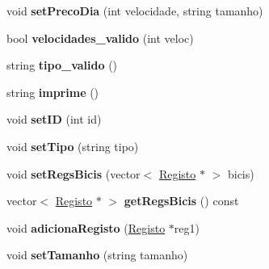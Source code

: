 \begin{DoxyCompactItemize}
\item 
\hypertarget{class_bicicleta_a830e5be0d74c904f9e1b4d0e46fcfbf6}{void {\bfseries set\+Preco\+Dia} (int velocidade, string tamanho)}\label{class_bicicleta_a830e5be0d74c904f9e1b4d0e46fcfbf6}

\item 
\hypertarget{class_bicicleta_a540f165785ed17b710a67c2a59991a48}{bool {\bfseries velocidades\+\_\+valido} (int veloc)}\label{class_bicicleta_a540f165785ed17b710a67c2a59991a48}

\item 
\hypertarget{class_bicicleta_a34990240a07a851793053ca4063a7b8e}{string {\bfseries tipo\+\_\+valido} ()}\label{class_bicicleta_a34990240a07a851793053ca4063a7b8e}

\item 
\hypertarget{class_bicicleta_a900359b6b195db211f479fe5929f8d81}{string {\bfseries imprime} ()}\label{class_bicicleta_a900359b6b195db211f479fe5929f8d81}

\item 
\hypertarget{class_bicicleta_a6e71bf61a37f13c3da8e620760f8f4b9}{void {\bfseries set\+I\+D} (int id)}\label{class_bicicleta_a6e71bf61a37f13c3da8e620760f8f4b9}

\item 
\hypertarget{class_bicicleta_a2318e7e7a22c44283e143f3c2942d721}{void {\bfseries set\+Tipo} (string tipo)}\label{class_bicicleta_a2318e7e7a22c44283e143f3c2942d721}

\item 
\hypertarget{class_bicicleta_ad5861007b46516987cab6fa7cf6adee1}{void {\bfseries set\+Regs\+Bicis} (vector$<$ \hyperlink{class_registo}{Registo} $\ast$ $>$ bicis)}\label{class_bicicleta_ad5861007b46516987cab6fa7cf6adee1}

\item 
\hypertarget{class_bicicleta_a05f9c922b7ebc82a1f223ba8c5d64cc2}{vector$<$ \hyperlink{class_registo}{Registo} $\ast$ $>$ {\bfseries get\+Regs\+Bicis} () const }\label{class_bicicleta_a05f9c922b7ebc82a1f223ba8c5d64cc2}

\item 
\hypertarget{class_bicicleta_a2520579ebcc40f9cc2ee05392f3004a2}{void {\bfseries adiciona\+Registo} (\hyperlink{class_registo}{Registo} $\ast$reg1)}\label{class_bicicleta_a2520579ebcc40f9cc2ee05392f3004a2}

\item 
\hypertarget{class_bicicleta_a28df135cc7d332d43ca85647fa60175a}{void {\bfseries set\+Tamanho} (string tamanho)}\label{class_bicicleta_a28df135cc7d332d43ca85647fa60175a}


\end{DoxyCompactItemize}
